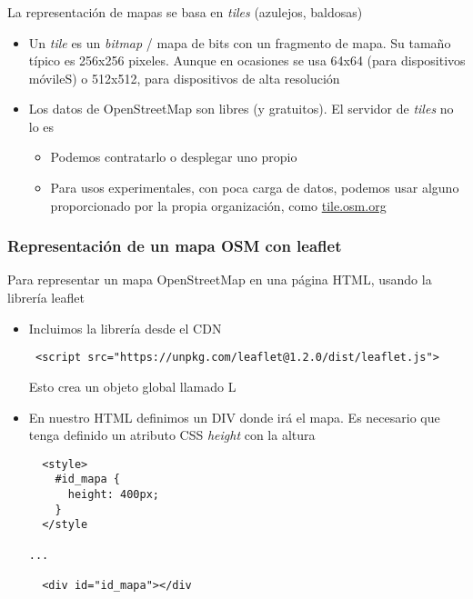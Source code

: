 \documentclass[ucs]{beamer}
\begin{document}
\begin{frame}[fragile]
\frametitle{}
La representación de mapas se basa en \emph{tiles} (azulejos, baldosas)


\begin{itemize}
\item
Un 
\emph{tile} es un \emph{bitmap} / mapa de bits con un fragmento de
mapa. Su tamaño típico es 256x256 pixeles. Aunque en ocasiones se usa
64x64 (para dispositivos móvileS) o 512x512, para dispositivos de alta
resolución

\item
Los datos de OpenStreetMap son libres (y gratuitos). El servidor
de 
\emph{tiles}
no lo es

    \begin{itemize}
    \item
Podemos contratarlo o desplegar uno propio

    \item
Para usos experimentales, con poca carga de datos, podemos usar
alguno proporcionado por la propia organización, como 
\url{tile.osm.org}
    \end{itemize}

\end{itemize}
\end{frame}




\begin{frame}[fragile]
\frametitle{Representación de un mapa OSM con leaflet}
Para representar un mapa OpenStreetMap en una página HTML, usando
la librería leaflet
\begin{itemize}
\item
Incluimos la librería desde el CDN


  \begin{scriptsize}
  \begin{verbatim}
 <script src="https://unpkg.com/leaflet@1.2.0/dist/leaflet.js">
  \end{verbatim}
  \end{scriptsize}

Esto crea un objeto global llamado L

\item
En nuestro HTML definimos un DIV donde irá el mapa. 
Es necesario que tenga definido 
un atributo CSS \emph{height} con la altura


  \begin{scriptsize}
  \begin{verbatim}
  <style>
    #id_mapa {
      height: 400px;
    }
  </style

...

  <div id="id_mapa"></div
  \end{verbatim}
  \end{scriptsize}
\end{itemize}
\end{frame}
\end{document}
